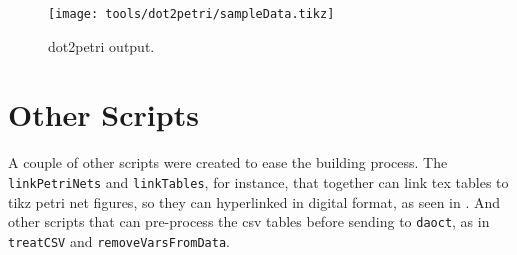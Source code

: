 \begin{figure}[H]
  \centering
  \texttt{[image: tools/dot2petri/sampleData.tikz]}
  \caption{dot2petri output.}
  \label{fig:Dot2automataSampleOutput}
\end{figure}

\section{Other Scripts}
\label{sec:otherScripts}
A couple of other scripts were created to ease the building process. The 
\verb|linkPetriNets| and \verb|linkTables|, for instance, that together can link tex tables to
tikz petri net figures, so they can hyperlinked in digital format, as seen in
. And other scripts that can pre-process the csv
tables before sending to \verb|daoct|, as in \verb|treatCSV| and \verb|removeVarsFromData|.


